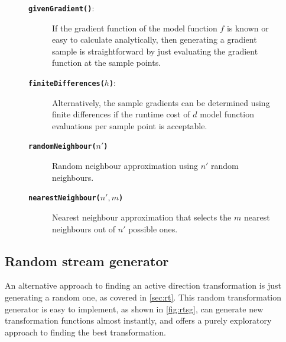 \documentclass[
  a4paper,  %
  twoside,  %
  bibliography=totoc,
  headsepline,
  cleardoublepage=empty,
  parskip=half,
  draft=false
]{scrbook}
\begin{document}
\begin{mdframed}[style=style,frametitle={Gradient sample generator}]
\begin{figure}[H]
\begin{description}
\item[\texttt{\textbf{givenGradient()}}:] If the gradient function of the model function $f$ is known or easy to calculate analytically, then generating a gradient sample is straightforward by just evaluating the gradient function at the sample points.
\item[\texttt{\textbf{finiteDifferences($h$)}}:] Alternatively, the sample gradients can be determined using finite differences if the runtime cost of $d$ model function evaluations per sample point is acceptable.
\item[\texttt{\textbf{randomNeighbour($n'$)}}] Random neighbour approximation using $n'$ random neighbours.
\item[\texttt{\textbf{nearestNeighbour($n', m$)}}] Nearest neighbour approximation that selects the $m$ nearest neighbours out of $n'$ possible ones.
\end{description}
\delimit
{}
\label{fig:gg}
\end{figure}
\end{mdframed}

\subsection {Random stream generator}
\label{sec:rtg}

An alternative approach to finding an active direction transformation is just generating a random one, as covered in \cref{sec:rt}.
This random transformation generator is easy to implement, as shown in \cref{fig:rtsg}, can generate new transformation functions almost instantly, and offers a purely exploratory approach to finding the best transformation.
\end{document}
